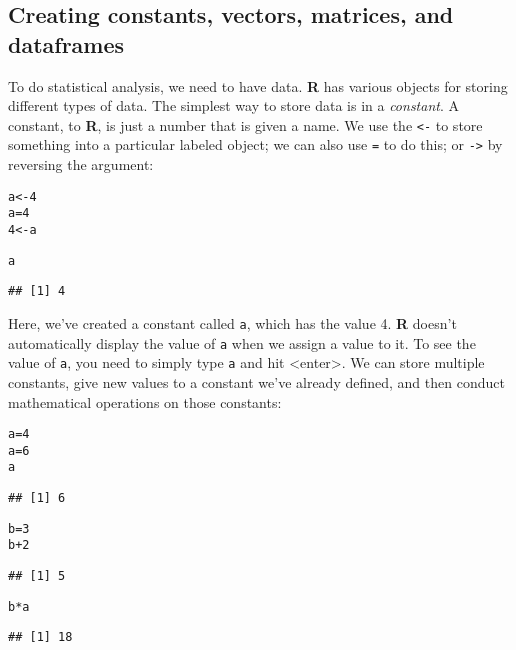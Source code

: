 \documentclass[12pt]{article}\usepackage[]{graphicx}\usepackage[]{color}
\makeatletter
\newcommand{\hlnum}[1]{\textcolor[rgb]{0.686,0.059,0.569}{#1}}%
\newcommand{\hlopt}[1]{\textcolor[rgb]{0,0,0}{#1}}%
\newcommand{\hlstd}[1]{\textcolor[rgb]{0.345,0.345,0.345}{#1}}%
\newcommand{\hlkwb}[1]{\textcolor[rgb]{0.69,0.353,0.396}{#1}}%
\newenvironment{kframe}{%
 \def\at@end@of@kframe{}%
 \ifinner\ifhmode%
  \def\at@end@of@kframe{\end{minipage}}%
  \begin{minipage}{\columnwidth}%
 \fi\fi%
 \def\FrameCommand##1{\hskip\@totalleftmargin \hskip-\fboxsep
 \colorbox{shadecolor}{##1}\hskip-\fboxsep
     \hskip-\linewidth \hskip-\@totalleftmargin \hskip\columnwidth}%
 \MakeFramed {\advance\hsize-\width
   \@totalleftmargin\z@ \linewidth\hsize
   \@setminipage}}%
 {\par\unskip\endMakeFramed%
 \at@end@of@kframe}
\newenvironment{knitrout}{}{} %
\makeatother
\begin{document}
\subsection{Creating constants, vectors, matrices, and dataframes}
To do statistical analysis, we need to have data. \textbf{R} has various objects for storing different types of data. The simplest way to store data is in a \emph{constant}. A constant, to \textbf{R}, is just a number that is given a name. We use the \verb|<-| to store something into a particular labeled object; we can also use \verb|=| to do this; or \verb|->| by reversing the argument:
\begin{knitrout}
\color{fgcolor}\begin{kframe}
\begin{alltt}
\hlstd{a} \hlkwb{<-} \hlnum{4}
\hlstd{a} \hlkwb{=} \hlnum{4}
\hlnum{4} \hlkwb{<-} \hlstd{a}
\end{alltt}


{\ttfamily\noindent\bfseries\color{errorcolor}{\#\# Error: invalid (do\_set) left-hand side to assignment}}\begin{alltt}
\hlstd{a}
\end{alltt}
\begin{verbatim}
## [1] 4
\end{verbatim}
\end{kframe}
\end{knitrout}

Here, we've created a constant called \verb|a|, which has the value 4. \textbf{R} doesn't automatically display the value of \verb|a| when we assign a value to it. To see the value of \verb|a|, you need to simply type \verb|a| and hit <enter>. We can store multiple constants, give new values to a constant we've already defined, and then conduct mathematical operations on those constants:
\begin{knitrout}
\color{fgcolor}\begin{kframe}
\begin{alltt}
\hlstd{a} \hlkwb{=} \hlnum{4}
\hlstd{a} \hlkwb{=} \hlnum{6}
\hlstd{a}
\end{alltt}
\begin{verbatim}
## [1] 6
\end{verbatim}
\begin{alltt}
\hlstd{b} \hlkwb{=} \hlnum{3}
\hlstd{b} \hlopt{+} \hlnum{2}
\end{alltt}
\begin{verbatim}
## [1] 5
\end{verbatim}
\begin{alltt}
\hlstd{b} \hlopt{*} \hlstd{a}
\end{alltt}
\begin{verbatim}
## [1] 18
\end{verbatim}
\end{kframe}
\end{knitrout}
\end{document}
